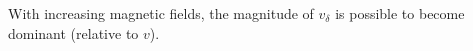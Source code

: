 \documentclass[prd, showpacs,nofootinbib,amsmath,amssymb]{revtex4}
\begin{document}
With increasing magnetic fields, the magnitude of $v_\delta$ is possible to
become dominant (relative to $v$). 
\end{document}
